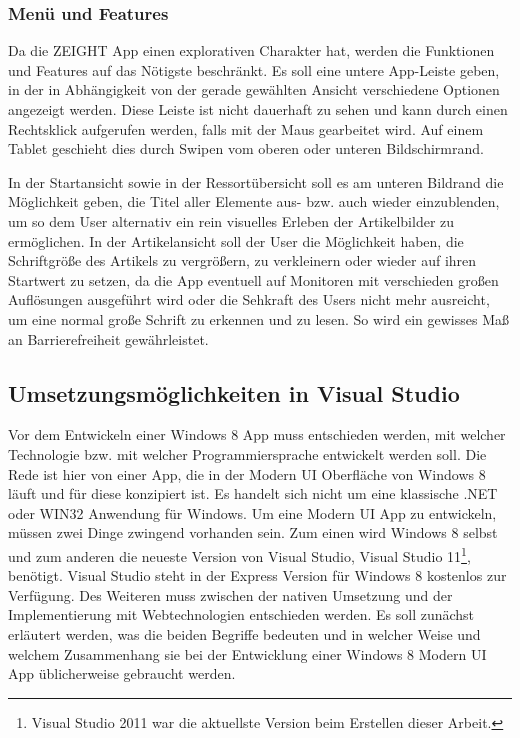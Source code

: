 \documentclass[12pt,a4paper,bibtotoc,abstracton]{scrartcl}
\begin{document}
\subsubsection{Menü und Features}
\label{subsubsec:menuandproperties}
Da die ZEIGHT App einen explorativen Charakter hat, werden die Funktionen und Features auf das Nötigste beschränkt. Es soll eine untere App-Leiste geben, in der in Abhängigkeit von der gerade gewählten Ansicht verschiedene Optionen angezeigt werden. Diese Leiste ist nicht dauerhaft zu sehen und kann durch einen Rechtsklick aufgerufen werden, falls mit der Maus gearbeitet wird. Auf einem Tablet geschieht dies durch Swipen vom oberen oder unteren Bildschirmrand.

In der Startansicht sowie in der Ressortübersicht soll es am unteren Bildrand die Möglichkeit geben, die Titel aller Elemente aus- bzw. auch wieder einzublenden, um so dem User alternativ ein rein visuelles Erleben der Artikelbilder zu ermöglichen. In der Artikelansicht soll der User die Möglichkeit haben, die Schriftgröße des Artikels zu vergrößern, zu verkleinern oder wieder auf ihren Startwert zu setzen, da die App eventuell auf Monitoren mit verschieden großen Auflösungen ausgeführt wird oder die Sehkraft des Users nicht mehr ausreicht, um eine normal große Schrift zu erkennen und zu lesen. So wird ein gewisses Maß an Barrierefreiheit gewährleistet. 


\subsection{Umsetzungsmöglichkeiten in Visual Studio}
\label{subsec:nativ_vs_web}
Vor dem Entwickeln einer Windows 8 App muss entschieden werden, mit welcher Technologie bzw. mit welcher Programmiersprache entwickelt werden soll. Die Rede ist hier von einer App, die in der Modern UI Oberfläche von Windows 8 läuft und für diese konzipiert ist. Es handelt sich nicht um eine klassische .NET oder WIN32 Anwendung für Windows. Um eine Modern UI App zu entwickeln, müssen zwei Dinge zwingend vorhanden sein. Zum einen wird Windows 8 selbst und zum anderen die neueste Version von Visual Studio, Visual Studio 11\footnote{Visual Studio 2011 war die aktuellste Version beim Erstellen dieser Arbeit.}, benötigt. Visual Studio steht in der Express Version für Windows 8 kostenlos zur Verfügung. Des Weiteren muss zwischen der nativen Umsetzung und der Implementierung mit Webtechnologien entschieden werden. Es soll zunächst erläutert werden, was die beiden Begriffe bedeuten und in welcher Weise und welchem Zusammenhang sie bei der Entwicklung einer Windows 8 Modern UI App üblicherweise gebraucht werden.
\end{document}
